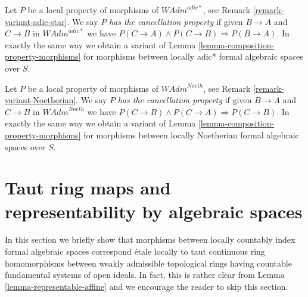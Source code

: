 \begin{remark}
\label{remark-permanence-variant-adic-star}
Let $P$ be a local property of morphisms of $\textit{WAdm}^{adic*}$, see
Remark \ref{remark-variant-adic-star}. We say $P$ {\it has the cancellation
property} if given $B \to A$ and $C \to B$ in $\textit{WAdm}^{adic*}$
we have $P(C \to A) \wedge P(C \to B) \Rightarrow P(B \to A)$.
In exactly the same way we obtain a variant of
Lemma \ref{lemma-composition-property-morphisms}
for morphisms between locally adic* formal algebraic spaces over $S$.
\end{remark}

\begin{remark}
\label{remark-permanence-variant-Noetherian}
Let $P$ be a local property of morphisms of $\textit{WAdm}^{Noeth}$, see
Remark \ref{remark-variant-Noetherian}. We say $P$
{\it has the cancellation property} if given $B \to A$ and $C \to B$
in $\textit{WAdm}^{Noeth}$ we have
$P(C \to B) \wedge P(C \to A) \Rightarrow P(C \to B)$.
In exactly the same way we obtain a variant of
Lemma \ref{lemma-composition-property-morphisms}
for morphisms between locally Noetherian formal algebraic spaces over $S$.
\end{remark}














\section{Taut ring maps and representability by algebraic spaces}
\label{section-taut}

\noindent
In this section we briefly show that morphisms between
locally countably index formal algebraic spaces correspond \'etale locally
to taut continuous ring homomorphisms between weakly admissible
topological rings having countable fundamental systems of open ideals.
In fact, this is rather clear from
Lemma \ref{lemma-representable-affine}
and we encourage the reader to skip this section.

